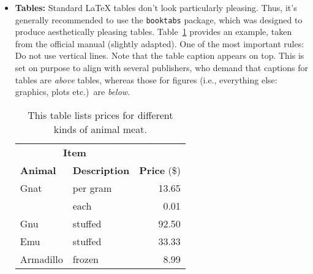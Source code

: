 \begin{itemize}
  
  \item \textbf{Tables:} Standard \LaTeX{} tables don't look particularly pleasing. Thus, it's generally recommended to use the \verb!booktabs! package, which was designed to produce aesthetically pleasing tables. Table~\ref{tab:meatPrices} provides an example, taken from the official manual (slightly adapted). One of the most important rules: Do not use vertical lines. Note that the table caption appears on top. This is set on purpose to align with several publishers, who demand that captions for tables are \emph{above} tables, whereas those for figures (i.e., everything else: graphics, plots etc.)\ are \emph{below}.

  \begin{table}[h] %
    \begin{tabular}{llr}
      \toprule
      \multicolumn{2}{c}{\textbf{Item}} \\
      \cmidrule(r){1-2}
      \textbf{Animal} & \textbf{Description} & \textbf{Price} (\$)\\
      \midrule
      Gnat            & per gram             & 13.65      \\
                      & each                 & 0.01       \\
      Gnu             & stuffed              & 92.50      \\
      Emu             & stuffed              & 33.33      \\
      Armadillo       & frozen               & 8.99       \\
      \bottomrule
    \end{tabular}
  \caption{This table lists prices for different kinds of animal meat.\label{tab:meatPrices}}
  \end{table}


\end{itemize}
